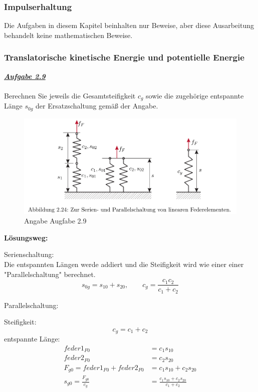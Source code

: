 \documentclass[a4paper,12p]{article}
\begin{document}
\subsubsection{Impulserhaltung}
Die Aufgaben in diesem Kapitel beinhalten nur Beweise, aber diese Ausarbeitung behandelt keine mathematischen Beweise.
\subsubsection{Translatorische kinetische Energie und potentielle Energie  }
\underline{\textbf{\textit{Aufgabe 2.9}}} \\ \\
Berechnen Sie jeweils die Gesamtsteifigkeit $c_{g}$ sowie die zugehörige entspannte Länge $s_{0g}$ der Ersatzschaltung gemäß der Angabe.
\begin{figure}[h]
	\begin{center}
		\includegraphics[width=12.5cm]{pic/Angabe2_9}
		\caption{Angabe Augfabe 2.9}
		\label{Aufgabe 2.9}
	\end{center}
\end{figure}
\newpage
\begin{flushleft}
	\textbf{Lösungsweg:}
\end{flushleft}
Serienschaltung:\\
Die entspannten Längen werde addiert und die Steifigkeit wird wie einer einer "Parallelschaltung" berechnet.
\[
	s_{0g} = s_{10} + s_{20}, \qquad c_{g} = \frac{c_{1}c_{2}}{c_{1} + c_{2}}
\]
\begin{flushleft}
Parallelschaltung:
\end{flushleft}
Steifigkeit:
\[ c_{g} = c_{1} + c_{2}\]
entspannte Länge:
\begin{align*}
	feder1_{F0} &= c_{1}s_{10} \\
	feder2_{F0} &= c_{2}s_{20} \\
	F_{g0} = feder1_{F0} + feder2_{F0} &= c_{1}s_{10} + c_{2}s_{20} \\
	s_{g0} = \frac{F_{g0}}{c_{g}} &= \frac{c_{1}s_{10} + c_{2}s_{20}}{c_{1} + c_{2}}
\end{align*}
\newpage
\end{document}
